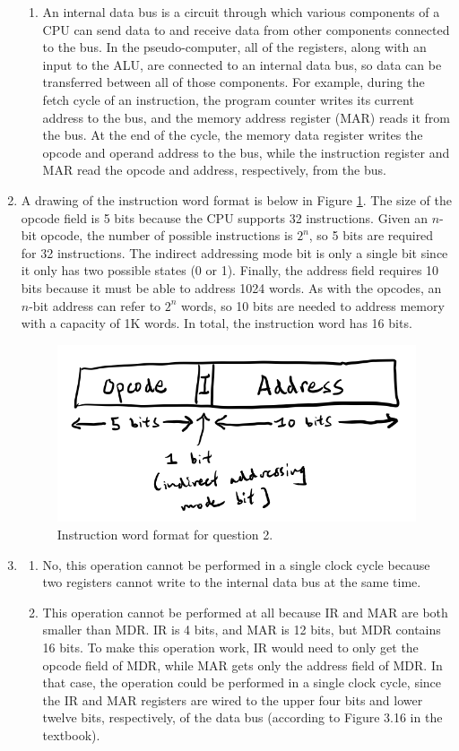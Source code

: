 \documentclass[11pt]{article}
\begin{document}
\begin{enumerate}[leftmargin=0.2in]
\begin{enumerate}
  \item An internal data bus is a circuit through which various components of a CPU can send data to and receive data from other components connected to the bus. In the pseudo-computer, all of the registers, along with an input to the ALU, are connected to an internal data bus, so data can be transferred between all of those components. For example, during the fetch cycle of an instruction, the program counter writes its current address to the bus, and the memory address register (MAR) reads it from the bus. At the end of the cycle, the memory data register writes the opcode and operand address to the bus, while the instruction register and MAR read the opcode and address, respectively, from the bus.
\end{enumerate}

\item A drawing of the instruction word format is below in Figure \ref{fig:q2}. The size of the opcode field is 5 bits because the CPU supports 32 instructions. Given an $n$-bit opcode, the number of possible instructions is $2^n$, so 5 bits are required for 32 instructions. The indirect addressing mode bit is only a single bit since it only has two possible states (0 or 1). Finally, the address field requires 10 bits because it must be able to address 1024 words. As with the opcodes, an $n$-bit address can refer to $2^n$ words, so 10 bits are needed to address memory with a capacity of 1K words. In total, the instruction word has 16 bits.

  \begin{figure}[H]
    \centering
    \includegraphics[width=.5\linewidth]{q2.jpeg}
    \caption{Instruction word format for question 2.}
    \label{fig:q2}
  \end{figure}

\item
\begin{enumerate}
  \item No, this operation cannot be performed in a single clock cycle because two registers cannot write to the internal data bus at the same time.

  \item This operation cannot be performed at all because IR and MAR are both smaller than MDR. IR is 4 bits, and MAR is 12 bits, but MDR contains 16 bits. To make this operation work, IR would need to only get the opcode field of MDR, while MAR gets only the address field of MDR. In that case, the operation could be performed in a single clock cycle, since the IR and MAR registers are wired to the upper four bits and lower twelve bits, respectively, of the data bus (according to Figure 3.16 in the textbook).


\end{enumerate}
\end{enumerate}
\end{document}
